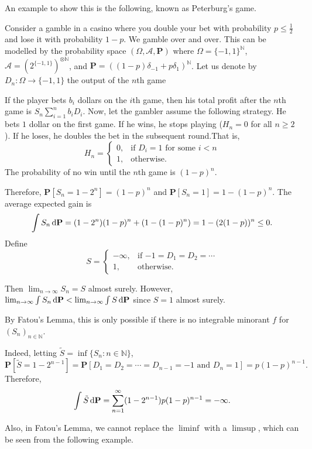 \vspace{2mm}
An example to show this is the following, known as Peterburg's game.

Consider a gamble in a casino where you double your bet with probability $p\leq\frac{1}{2}$ and lose it with probability $1-p$. We gamble over and over. This can be modelled by the probability space $(\Omega,\mathcal{A},\textbf{P})$ where $\Omega=\{-1,1\}^\mathbb{N}$, $\mathcal{A}=(2^{\{-1,1\}})^{\otimes\mathbb{N}}$, and $\textbf{P}=((1-p)\delta_{-1} + p\delta_1)^\mathbb{N}$. Let us denote by $D_n:\Omega\to\{-1,1\}$ the output of the $n$th game

\vspace{1mm}
If the player bets $b_i$ dollars on the $i$th game, then his total profit after the $n$th game is $S_n\sum_{i=1}^n b_iD_i$. Now, let the gambler assume the following strategy. He bets $1$ dollar on the first game. If he wins, he stops playing ($H_n=0$ for all $n\geq 2$). If he loses, he doubles the bet in the subsequent round.That is,
$$
H_n=
\begin{cases}
    0, &\text{if $D_i=1$ for some $i<n$} \\
    1, &\text{otherwise.}
\end{cases}
$$
The probability of no win until the $n$th game is $(1-p)^n$.

Therefore, $\textbf{P}[S_n=1-2^n]=(1-p)^n$ and $\textbf{P}[S_n=1]=1-(1-p)^n$. The average expected gain is
$$\int S_n\operatorname{d}\!{\textbf{P}} = (1-2^n)(1-p)^n + (1-(1-p)^n)=1-(2(1-p))^n\leq 0.$$
Define
$$
S=
\begin{cases}
    -\infty, &\text{if $-1=D_1=D_2=\cdots$} \\
    1, &\text{otherwise.}
\end{cases}
$$

Then $\lim_{n\to\infty} S_n = S$ almost surely. However, $\lim_{n\to\infty}\int S_n\operatorname{d}\!{\textbf{P}} < \lim_{n\to\infty}\int S\operatorname{d}\!{\textbf{P}}$ since $S=1$ almost surely. 

By Fatou's Lemma, this is only possible if there is no integrable minorant $f$ for $(S_n)_{n\in\mathbb{N}}$.

Indeed, letting $\tilde S = \inf \{S_n:{n\in\mathbb{N}}\}$,
$$\textbf{P}[\tilde S = 1-2^{n-1}]=\textbf{P}[D_1=D_2=\cdots=D_{n-1}=-1\text{ and }D_n=1]=p(1-p)^{n-1}.$$
Therefore,
$$\int \tilde S\operatorname{d}\!{\textbf{P}}=\sum_{n=1}^\infty (1-2^{n-1})p(1-p)^{n-1}=-\infty.$$

\vspace{2mm}

Also, in Fatou's Lemma, we cannot replace the $\liminf$ with a $\limsup$, which can be seen from the following example.

